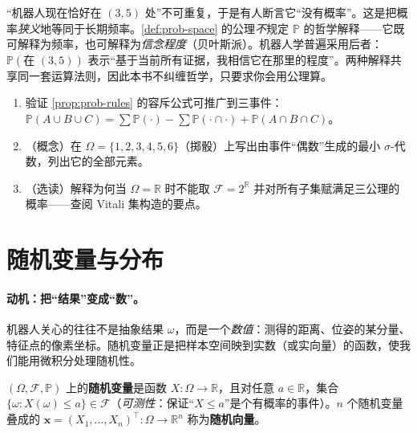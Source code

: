 \begin{pitfall}
“机器人现在恰好在 $(3,5)$ 处”不可重复，于是有人断言它“没有概率”。这是把概率\emph{狭义}地等同于长期频率。\cref{def:prob-space} 的公理\emph{不}规定 $\mathbb{P}$ 的哲学解释——它既可解释为频率，也可解释为\emph{信念程度}（贝叶斯派）。机器人学普遍采用后者：$\mathbb{P}(\text{在 }(3,5))$ 表示“基于当前所有证据，我相信它在那里的程度”。两种解释共享同一套运算法则，因此本书不纠缠哲学，只要求你会用公理算。
\end{pitfall}

\begin{practice}
\begin{enumerate}
  \item 验证 \cref{prop:prob-rules} 的容斥公式可推广到三事件：$\mathbb{P}(A\cup B\cup C)=\sum\mathbb{P}(\cdot)-\sum\mathbb{P}(\cdot\cap\cdot)+\mathbb{P}(A\cap B\cap C)$。
  \item （概念）在 $\Omega=\{1,2,3,4,5,6\}$（掷骰）上写出由事件“偶数”生成的最小 $\sigma$-代数，列出它的全部元素。
  \item （选读）解释为何当 $\Omega=\mathbb{R}$ 时不能取 $\mathcal{F}=2^{\mathbb{R}}$ 并对所有子集赋满足三公理的概率——查阅 Vitali 集构造的要点。
\end{enumerate}
\end{practice}

\section{随机变量与分布}
\label{sec:prob-rv}

\paragraph{动机：把“结果”变成“数”。}
机器人关心的往往不是抽象结果 $\omega$，而是一个\emph{数值}：测得的距离、位姿的某分量、特征点的像素坐标。随机变量正是把样本空间映到实数（或实向量）的函数，使我们能用微积分处理随机性。

\begin{definition}[随机变量与随机向量]\label{def:random-variable}
$(\Omega,\mathcal{F},\mathbb{P})$ 上的\textbf{随机变量}是函数 $X:\Omega\to\mathbb{R}$，且对任意 $a\in\mathbb{R}$，集合 $\{\omega:X(\omega)\le a\}\in\mathcal{F}$（\emph{可测性}：保证“$X\le a$”是个有概率的事件）。$n$ 个随机变量叠成的 $\mathbf{x}=(X_1,\dots,X_n)^\top:\Omega\to\mathbb{R}^n$ 称为\textbf{随机向量}。
\end{definition}

